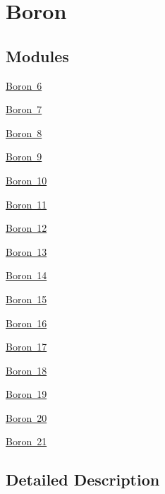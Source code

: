 \hypertarget{group___isotope_const-_boron}{}\section{Boron}
\label{group___isotope_const-_boron}
\subsection*{Modules}
\begin{DoxyCompactItemize}
\item 
\mbox{\hyperlink{group___isotope_const-_boron-_b6}{Boron 6}}
\item 
\mbox{\hyperlink{group___isotope_const-_boron-_b7}{Boron 7}}
\item 
\mbox{\hyperlink{group___isotope_const-_boron-_b8}{Boron 8}}
\item 
\mbox{\hyperlink{group___isotope_const-_boron-_b9}{Boron 9}}
\item 
\mbox{\hyperlink{group___isotope_const-_boron-_b10}{Boron 10}}
\item 
\mbox{\hyperlink{group___isotope_const-_boron-_b11}{Boron 11}}
\item 
\mbox{\hyperlink{group___isotope_const-_boron-_b12}{Boron 12}}
\item 
\mbox{\hyperlink{group___isotope_const-_boron-_b13}{Boron 13}}
\item 
\mbox{\hyperlink{group___isotope_const-_boron-_b14}{Boron 14}}
\item 
\mbox{\hyperlink{group___isotope_const-_boron-_b15}{Boron 15}}
\item 
\mbox{\hyperlink{group___isotope_const-_boron-_b16}{Boron 16}}
\item 
\mbox{\hyperlink{group___isotope_const-_boron-_b17}{Boron 17}}
\item 
\mbox{\hyperlink{group___isotope_const-_boron-_b18}{Boron 18}}
\item 
\mbox{\hyperlink{group___isotope_const-_boron-_b19}{Boron 19}}
\item 
\mbox{\hyperlink{group___isotope_const-_boron-_b20}{Boron 20}}
\item 
\mbox{\hyperlink{group___isotope_const-_boron-_b21}{Boron 21}}
\end{DoxyCompactItemize}


\subsection{Detailed Description}
